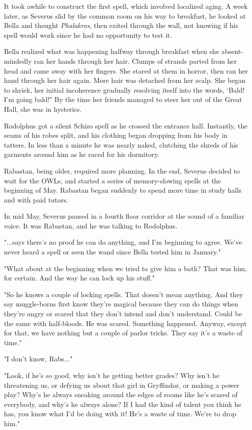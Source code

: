 \documentclass[a4paper,11pt]{article}
\begin{document}
It took awhile to construct the first spell, which involved localized aging. A week later, as Severus slid by the common room on his way to breakfast, he looked at Bella and thought \emph{Phalakros}, then exited through the wall, not knowing if his spell would work since he had no opportunity to test it.

Bella realized what was happening halfway through breakfast when she absent-mindedly ran her hands through her hair. Clumps of strands parted from her head and came away with her fingers. She stared at them in horror, then ran her hand through her hair again. More hair was detached from her scalp. She began to shriek, her initial incoherence gradually resolving itself into the words, `Bald! I'm going bald!" By the time her friends managed to steer her out of the Great Hall, she was in hysterics.

Rodolphus got a silent Schizo spell as he crossed the entrance hall. Instantly, the seams of his robes split, and his clothing began dropping from his body in tatters. In less than a minute he was nearly naked, clutching the shreds of his garments around him as he raced for his dormitory.

Rabastan, being older, required more planning. In the end, Severus decided to wait for the OWLs, and started a series of memory-slowing spells at the beginning of May. Rabastan began suddenly to spend more time in study halls and with paid tutors.

In mid May, Severus paused in a fourth floor corridor at the sound of a familiar voice. It was Rabastan, and he was talking to Rodolphus.

"...says there's no proof he can do anything, and I'm beginning to agree. We've never heard a spell or seen the wand since Bella tested him in January."

"What about at the beginning when we tried to give him a bath? That was him, for certain. And the way he can lock up his stuff."

"So he knows a couple of locking spells. That doesn't mean anything. And they say muggle-borns first know they're magical because they can do things when they're angry or scared that they don't intend and don't understand. Could be the same with half-bloods. He was scared. Something happened. Anyway, except for that, we have nothing but a couple of parlor tricks. They say it's a waste of time."

"I don't know, Rabs..."

"Look, if he's so good, why isn't he getting better grades? Why isn't he threatening us, or defying us about that girl in Gryffindor, or making a power play? Why's he always sneaking around the edges of rooms like he's scared of everybody, and why's he always alone? If I had the kind of talent you think he has, you know what I'd be doing with it! He's a waste of time. We're to drop him."
\end{document}
